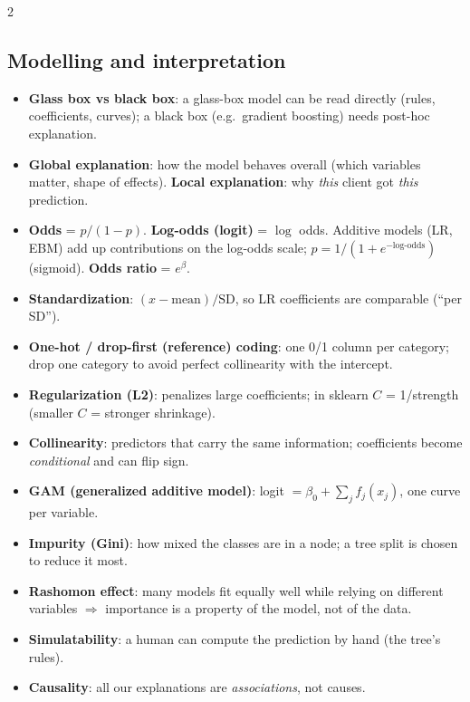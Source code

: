 \documentclass[a4paper,9pt]{extarticle}
\newcommand{\term}[1]{\textbf{\color{accent}#1}}
\begin{document}
\begin{multicols}{2}
\subsection{Modelling and interpretation}
\begin{itemize}
\item \term{Glass box vs black box}: a glass-box model can be read directly (rules, coefficients, curves); a
      black box (e.g.\ gradient boosting) needs post-hoc explanation.
\item \term{Global explanation}: how the model behaves overall (which variables matter, shape of effects).
      \term{Local explanation}: why \emph{this} client got \emph{this} prediction.
\item \term{Odds} = $p/(1-p)$. \term{Log-odds (logit)} = $\log$ odds. Additive models (LR, EBM) add up
      contributions on the log-odds scale; $p = 1/(1+e^{-\text{log-odds}})$ (sigmoid).
      \term{Odds ratio} = $e^{\beta}$.
\item \term{Standardization}: $(x-\text{mean})/\text{SD}$, so LR coefficients are comparable (``per SD'').
\item \term{One-hot / drop-first (reference) coding}: one 0/1 column per category; drop one category to avoid
      perfect collinearity with the intercept.
\item \term{Regularization (L2)}: penalizes large coefficients; in sklearn $C$ = 1/strength
      (smaller $C$ = stronger shrinkage).
\item \term{Collinearity}: predictors that carry the same information; coefficients become
      \emph{conditional} and can flip sign.
\item \term{GAM (generalized additive model)}: logit $= \beta_0 + \sum_j f_j(x_j)$, one curve per variable.
\item \term{Impurity (Gini)}: how mixed the classes are in a node; a tree split is chosen to reduce it most.
\item \term{Rashomon effect}: many models fit equally well while relying on different variables
      $\Rightarrow$ importance is a property of the model, not of the data.
\item \term{Simulatability}: a human can compute the prediction by hand (the tree's rules).
\item \term{Causality}: all our explanations are \emph{associations}, not causes.
\end{itemize}


\end{multicols}
\end{document}
